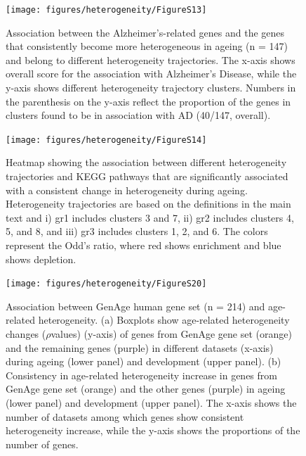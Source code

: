 \documentclass[12pt,twoside]{unicam}
\begin{document}
\begin{figure}

{\centering \texttt{[image: figures/heterogeneity/FigureS13]} 

}

\caption[Association between the Alzheimer's-related genes and the genes that consistently become more heterogeneous in ageing (n = 147) and belong to different heterogeneity trajectories.]{Association between the Alzheimer's-related genes and the genes that consistently become more heterogeneous in ageing (n = 147) and belong to different heterogeneity trajectories. The x-axis shows overall score for the association with Alzheimer's Disease, while the y-axis shows different heterogeneity trajectory clusters. Numbers in the parenthesis on the y-axis reflect the proportion of the genes in clusters found to be in association with AD (40/147, overall).}\label{fig:hetFigS13}
\end{figure}

\begin{figure}

{\centering \texttt{[image: figures/heterogeneity/FigureS14]} 

}

\caption[Association between different heterogeneity trajectories and KEGG pathways that are significantly associated with a consistent change in heterogeneity during ageing]{Heatmap showing the association between different heterogeneity trajectories and KEGG pathways that are significantly associated with a consistent change in heterogeneity during ageing. Heterogeneity trajectories are based on the definitions in the main text and i) gr1 includes clusters 3 and 7, ii) gr2 includes clusters 4, 5, and 8, and iii) gr3 includes clusters 1, 2, and 6. The colors represent the Odd’s ratio, where red shows enrichment and blue shows depletion.}\label{fig:hetFigS14}
\end{figure}

\begin{figure}

{\centering \texttt{[image: figures/heterogeneity/FigureS20]} 

}

\caption[Association between GenAge human gene set and age-related heterogeneity]{Association between GenAge human gene set (n = 214) and age-related heterogeneity. (a) Boxplots show age-related heterogeneity changes ($\rho$values) (y-axis) of genes from GenAge gene set (orange) and the remaining genes (purple) in different datasets (x-axis) during ageing (lower panel) and development (upper panel). (b) Consistency in age-related heterogeneity increase in genes from GenAge gene set (orange) and the other genes (purple) in ageing (lower panel) and development (upper panel). The x-axis shows the number of datasets among which genes show consistent heterogeneity increase, while the y-axis shows the proportions of the number of genes.}\label{fig:hetFigS20}
\end{figure}
\end{document}
